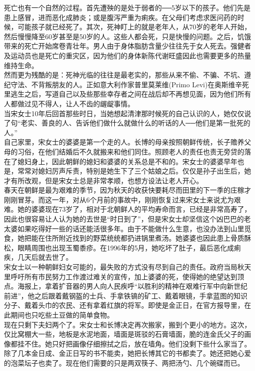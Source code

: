 死亡也有一个自然的过程。首先遭殃的是处于弱者的──5岁以下的孩子。他们先是患上感冒，进而恶化成肺炎；或是腹泻严重为痢疾。在父母们考虑求医问药的时候，可能孩子就已经死了。其次，死神盯上的就是老年人，从70岁的老年人开始，然后慢慢降至60岁甚至是50岁的人。这些人都会死，只是快慢的问题。之后，饥饿带来的死亡开始席卷青壮年。男人由于身体脂肪含量少往往先于女人死去。强健者及运动员也是死亡的重灾区，因为他们的身体新陈代谢旺盛因此也需要更多的热量维持生命。\\

然而更为残酷的是：死神光临的往往是最老实的，那些从来不偷、不骗、不坑、遵纪守法、不背叛朋友的人。正如意大利作家普里莫莱维(Primo Levi)在奥斯维辛死里逃生之后，写道自己以及些那些幸存者之间在战后却不再想见面，因为他们所有人都做过见不得人，让人不齿的龌龊事情。\\

当宋女士10年后回首那些时日，当她想起清津那时候死的自己认识的人，她仅仅说了句“老实、善良的人、告诉他们做什么就做什么的听话的人──他们是第一批死的人。”\\

自己家里，宋女士的婆婆是第一个走的人。长博的母亲按照朝鲜传统，长子赡养父母的习俗，在他们结婚后不久就搬来和他们同住。照顾老人的责任也责无旁贷的落在了媳妇身上，因此朝鲜的媳妇和婆婆的关系总是不和的。宋女士的婆婆早年也是，常常对媳妇厉声斥责，特别是她生下了三个姑娘之后。仅仅是孙子出生后，她才有所改观，但是宋女士总是非常孝顺，也想方设法让老人开心。\\

春天在朝鲜是最为艰难的季节，因为秋天的收获快要耗尽而田里的下一季的庄稼才刚刚冒芽。而这一年，对从6个月前的事故中，刚刚恢复过来宋女士来说尤为艰难。她的婆婆现在73岁了，相对于北朝鲜人的平均寿命而言，已经是非常高寿了，因此也很容易让人认为她的去世是“时日到了”，但是宋女士却坚信这个凶巴巴的老太婆如果吃得好一些的话还能活很多年。由于不能做什么生意，也没办法到山里觅食，她把能在住所附近找到的野菜统统都扔进锅里煮汤。她婆婆也因此患上骨质酥松，眼睛周围也出现玉蜀黍疹。在1996年的5月，她吃坏了肚子，最后恶化成痢疾，几天后就去世了。\\

宋女士以一种朝鲜妇女可能的，最失败的方式没有尽到自己的责任。政府当局秋天里呼吁所有市民努力工作渡过难关的宣传，加上婆婆的死，使得她的绝望达到顶点。海报上，拿着扩音器的男人向人民疾呼“以胜利的精神在艰难行军中向新世纪前进”，他之后跟着戴钢盔的士兵、手拿铁镐的矿工、戴着眼镜，手拿蓝图的知识分子、戴着头巾的农民、还有拿着红旗的将军。即使是金正日，在官方报导里，在此期间也只吃些土豆做的简单食物。\\

现在只剩下夫妇两个了。宋女士和长博决定再次搬家，搬到个更小的地方。这次，仅比窝棚大一些，地板是水泥地面，墙面是斑驳的石膏墙面，脆的连金氏父子的画像都挂不住。她只好把画像仔细擦拭之后，放在墙角。他们没剩下些什么家当了。除了几本金日成、金正日写的书不能卖，她把长博其它的书都卖了。她还把她心爱的泡菜坛子也卖了。现在他们需要的只是两双筷子、两把汤勺、几个碗碟而已。\\

